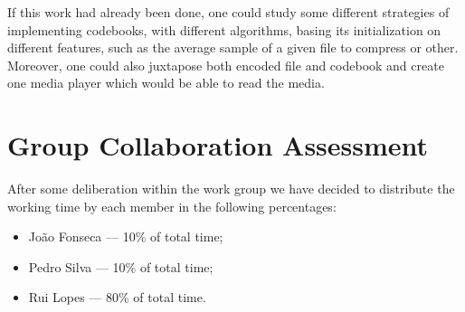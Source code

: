 \documentclass[conference]{IEEEtran}
\begin{document}
If this work had already been done, one could study some different strategies of implementing codebooks, with different algorithms, basing its initialization on different features, such as the average sample of a given file to compress or other. Moreover, one could also juxtapose both encoded file and codebook and create one media player which would be able to read the media.

\section{Group Collaboration Assessment}

After some deliberation within the work group we have decided to distribute the working time by each member in the following percentages: 

\begin{itemize}
	\item João Fonseca — 10\% of total time;
	\item Pedro Silva — 10\% of total time;
	\item Rui Lopes — 80\% of total time.
\end{itemize}
\end{document}
